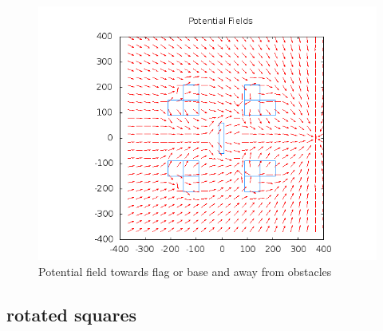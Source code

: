 \documentclass[11pt]{article}
\begin{document}
\begin{figure}[h!]
	\caption{Potential field towards flag or base and away from obstacles}
	\includegraphics[scale=.4]{plots/four_ls/pfFlagsAndObstacles.png}
\end{figure}

\subsection{rotated squares}
\end{document}
